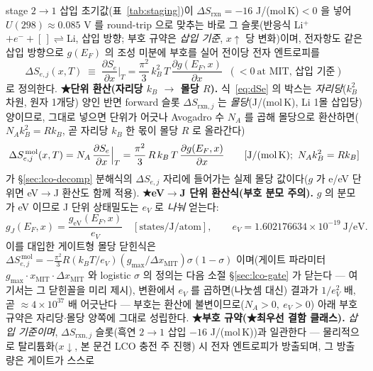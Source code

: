 \documentclass[11pt,a4paper]{article}
\newcommand{\rxn}{\mathrm{rxn}}
\begin{document}
stage $2\!\to\!1$ 삽입 초기값(표~\ref{tab:staging})이 $\Delta S_\rxn=-16$ J/(mol\,K)$<0$
을 넣어 $U(298)\approx0.085$ V 를 round-trip 으로 맞추는 바로 그 슬롯(반응식
Li$^+$$+e^-+[\,]\rightleftharpoons$Li, 삽입 방향; 부호 규약은 \emph{삽입 기준}, $x\!\uparrow$ 당 변화)이며,
전자항도 같은 삽입 방향으로 $g(E_F)$ 의 조성 미분에 부호를 실어 전이당 전자 엔트로피를
\begin{equation}
\boxed{\;\Delta S_{e,j}(x,T)\;\equiv\;\frac{\partial S_e}{\partial x}\Big|_T
=\frac{\pi^2}{3}\,k_B^2\,T\,\frac{\partial g(E_F,x)}{\partial x}\;\;(<0\ \text{at MIT, 삽입 기준})\;}
\label{eq:dSe}
\end{equation}
로 정의한다. \textbf{★단위 환산(자리당 $k_B$ $\to$ 몰당 $R$).} 식~\eqref{eq:dSe} 의 박스는 \emph{자리당}($k_B^2$ 차원, 원자 1개당) 양인 반면 forward 슬롯
$\Delta S_{\rxn,j}$ 는 \emph{몰당}(J/(mol\,K), Li 1몰 삽입당) 양이므로, 그대로 넣으면 단위가 어긋나 Avogadro 수
$N_A$ 를 곱해 몰당으로 환산하면($N_A k_B^2=R k_B$, 곧 자리당 $k_B$ 한 몫이 몰당 $R$ 로 올라간다)
\begin{equation}
\Delta S_{e,j}^{\,\mathrm{mol}}(x,T)=N_A\,\frac{\partial S_e}{\partial x}\Big|_T
=\frac{\pi^2}{3}\,R\,k_B\,T\,\frac{\partial g(E_F,x)}{\partial x}
\qquad[\text{J/(mol\,K)};\ N_A k_B^2=R k_B]
\label{eq:dSemolar}
\end{equation}
가 \S\ref{sec:lco-decomp} 분해식의 $\Delta S_{e,j}$ 자리에 들어가는 실제 몰당 값이다($g$ 가 e/eV 단위면 eV$\to$J
환산도 함께 적용). \textbf{★eV$\to$J 단위 환산식(부호 분모 주의).} $g$ 의 분모가 eV 이므로 J 단위 상태밀도는 $e_V$ 로 \emph{나눠} 얻는다:
\begin{equation}
g_J(E_F,x)=\frac{g_{\mathrm{eV}}(E_F,x)}{e_V}\quad[\text{states/J/atom}],
\qquad e_V=1.602176634\times10^{-19}\ \text{J/eV}.
\label{eq:gunit}
\end{equation}
이를 대입한 게이트형 몰당 닫힌식은 $\Delta S_{e,j}^{\,\mathrm{mol}}=-\tfrac{\pi^2}{3}R(k_BT/e_V)(g_{\max}/
\Delta x_\mathrm{MIT})\sigma(1-\sigma)$ 이며(게이트 파라미터 $g_{\max}\cdot x_\mathrm{MIT}\cdot\Delta x_\mathrm{MIT}$
와 logistic $\sigma$ 의 정의는 다음 소절 \S\ref{sec:lco-gate} 가 닫는다 — 여기서는 그 닫힌꼴을 미리 제시),
변환에서 $e_V$ 를 곱하면(나눗셈 대신) 결과가 $1/e_V^2$ 배, 곧
$\approx4\times10^{37}$ 배 어긋난다 — 부호는
환산에 불변이므로($N_A>0,\ e_V>0$) 아래 부호 규약은 자리당$\cdot$몰당 양쪽에 그대로 성립한다. \textbf{★부호 규약(★최우선 결함 클래스).} \emph{삽입 기준이며}, $\Delta S_{\rxn,j}$ 슬롯(흑연 $2\!\to\!1$ 삽입 $-16$ J/(mol\,K))과 일관한다 — 물리적으로
탈리튬화($x\!\downarrow$, 본 문건 LCO 충전 주 진행) 시 전자 엔트로피가 방출되며, 그 방출량은 게이트가 스스로
$$
\end{document}
